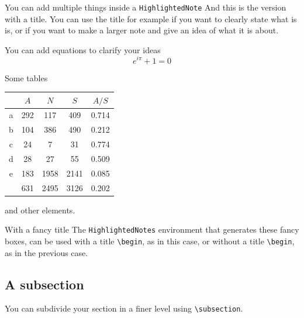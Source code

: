 \documentclass{project-logbook}
\begin{document}
	\begin{HighlightedNote}{You can add multiple things inside a \texttt{HighlightedNote}}
		And this is the version with a title. You can use the title for example if you want to clearly state what is is, or if you want to make a larger note and give an idea of what it is about.

		You can add equations to clarify your ideas
		\begin{equation}
			e^{i\pi} + 1 = 0
		\end{equation}

		Some tables

		\begin{center}
			\begin{tabular}{ccccc}
            			{}  & \multicolumn{1}{c}{$A$} & \multicolumn{1}{c}{$N$} & \multicolumn{1}{c}{$S$} & \multicolumn{1}{c}{$A/S$} \\
            			\midrule
            			a & 292 & 117   & 409   & 0.714 \\
            			b & 104 & 386   & 490   & 0.212 \\
            			c & 24  & 7     & 31    & 0.774 \\
            			d & 28  & 27    & 55    & 0.509 \\
            			e & 183 & 1958  & 2141  & 0.085 \\
            			\midrule
            			& 631 & 2495 & 3126 & 0.202 \\
        			\end{tabular}
    		\end{center}
		and other elements.

	\end{HighlightedNote}

	\begin{HighlightedNote}{With a fancy title}
		The \texttt{HighlightedNotes} environment that generates these fancy boxes, can be used with a title \texttt{\textbackslash begin}, as in this case, or without a title \texttt{\textbackslash begin\string{\string}}, as in the previous case.
	\end{HighlightedNote}

	\subsection{A subsection}
		You can subdivide your section in a finer level using \texttt{\textbackslash subsection}.
\end{document}
